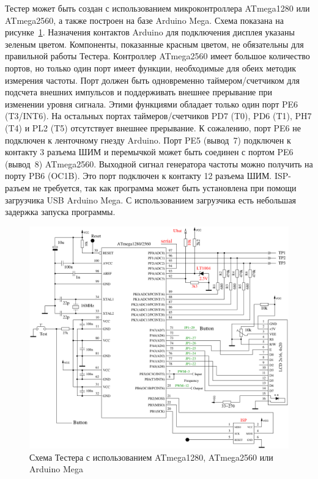 Тестер может быть создан с использованием микроконтроллера ATmega1280 
или ATmega2560, а также построен на базе Arduino Mega.
Схема показана на рисунке~\ref{fig:t1280tester}.
Назначения контактов Arduino для подключения дисплея указаны зеленым цветом.
Компоненты, показанные красным цветом, не обязательны для правильной работы Тестера.
Контроллер ATmega2560 имеет большое количество портов, но только один порт
имеет функции, необходимые для обеих методик измерения частоты.
Порт должен быть одновременно таймером/счетчиком для подсчета внешних импульсов и
поддерживать внешнее прерывание при изменении уровня сигнала.
Этими функциями обладает только один порт PE6 (T3/INT6).
На остальных портах таймеров/счетчиков PD7 (T0), PD6 (T1), PH7 (T4) и PL2 (T5) отсутствует
внешнее прерывание.
К сожалению, порт PE6 не подключен к ленточному гнезду Arduino. 
Порт PE5 (вывод~7) подключен к контакту 3 разъема ШИМ и перемычкой 
может быть соединен с портом PE6 (вывод~8) ATmega2560.
Выходной сигнал генератора частоты можно получить на порту PB6 (OC1B).
Это порт подключен к контакту 12 разъема ШИМ.
ISP-разъем не требуется, так как программа может быть установлена при помощи  
загрузчика USB Arduino Mega. С использованием загрузчика есть небольшая задержка 
запуска программы.

\begin{figure}[H]
\centering
\includegraphics[width=1.\textwidth]{../FIG/t1280tester.pdf}
\caption{Схема Тестера с использованием ATmega1280, ATmega2560 или Arduino Mega}
\label{fig:t1280tester}
\end{figure}

